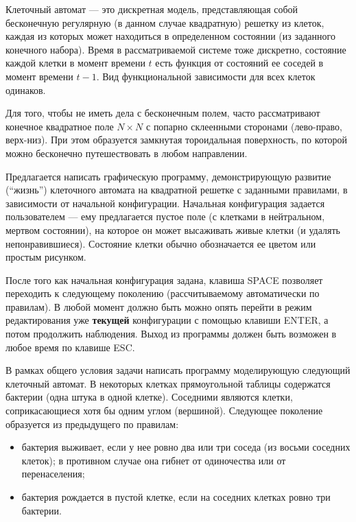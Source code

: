 
Клеточный автомат --- это дискретная модель, представляющая собой бесконечную 
регулярную (в данном случае квадратную) решетку из клеток, каждая из которых 
может находиться в определенном состоянии (из заданного конечного набора). 
Время в рассматриваемой системе тоже 
дискретно, состояние каждой клетки в момент времени $t$ есть функция от 
состояний ее соседей в момент времени $t-1$. Вид функциональной зависимости для
всех клеток одинаков.

Для того, чтобы не иметь дела с бесконечным полем, часто рассматривают конечное
квадратное поле \mbox{$N\times N$} с попарно склеенными сторонами (лево-право, верх-низ).
При этом образуется замкнутая тороидальная поверхность, по которой можно 
бесконечно путешествовать в любом направлении.

Предлагается написать графическую программу, демонстрирующую развитие (``жизнь'')
клеточного автомата на квадратной решетке с заданными правилами, в 
зависимости от начальной конфигурации. Начальная конфигурация задается 
пользователем --- ему предлагается пустое поле (с клетками в нейтральном, 
мертвом состоянии), на которое он может высаживать живые клетки (и удалять 
непонравившиеся). Состояние клетки обычно обозначается ее цветом или простым
рисунком.

После того как начальная конфигурация задана, клавиша SPACE 
позволяет переходить к следующему поколению (рассчитываемому автоматически 
по правилам). В любой момент должно быть можно опять перейти в режим 
редактирования уже \textbf{текущей} конфигурации с помощью клавиши ENTER, а 
потом продолжить наблюдения. Выход из программы должен быть возможен в любое время
по клавише ESC.

\begin{zztask}
В рамках общего условия задачи написать программу моделирующую следующий 
клеточный автомат.
В некоторых клетках прямоугольной таблицы содержатся бактерии (одна штука 
в одной клетке). Соседними являются клетки, соприкасающиеся хотя бы одним углом
(вершиной). Следующее поколение образуется из предыдущего по правилам:
\begin{itemize}
	\item бактерия выживает, если у нее ровно два или три соседа (из восьми 
	соседних клеток); в противном случае она гибнет от одиночества или от 
	перенаселения;
	\item бактерия рождается в пустой клетке, если на соседних клетках ровно 
	три бактерии.
\end{itemize}
\end{zztask}

